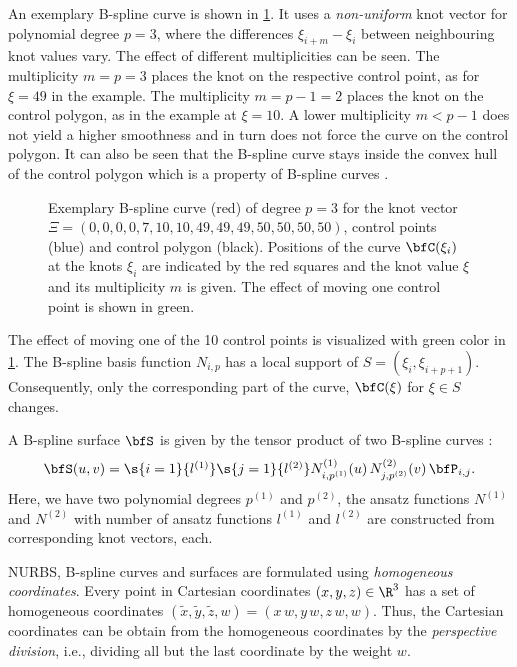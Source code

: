 An exemplary B-spline curve is shown in \cref{fig:bspline_curve}. It uses a \emph{non-uniform} knot vector for polynomial degree $p=3$, where the differences $\xi_{i+m} - \xi_i$ between neighbouring knot values vary. The effect of different multiplicities can be seen. The multiplicity $m=p=3$ places the knot on the respective control point, as for $\xi=49$ in the example. The multiplicity $m=p-1=2$ places the knot on the control polygon, as in the example at $\xi=10$. A lower multiplicity $m < p-1$ does not yield a higher smoothness and in turn does not force the curve on the control polygon. It can also be seen that the B-spline curve stays inside the convex hull of the control polygon which is a property of B-spline curves \cite{piegl2012nurbs}.

\begin{figure}%
  \centering%
  \def\svgwidth{8cm}%
  \caption{Exemplary B-spline curve (red) of degree $p=3$ for the knot vector $\Xi = (0,0,0,0,7,10,10,49,49,49,50,50,50,50)$, control points (blue) and control polygon (black).
  Positions of the curve $\bfC(\xi_i)$ at the knots $\xi_i$ are indicated by the red squares and the knot value $\xi$ and its multiplicity $m$ is given. The effect of moving one control point is shown in green.}%
  \label{fig:bspline_curve}%
\end{figure}%
%
The effect of moving one of the 10 control points is visualized with green color in \cref{fig:bspline_curve}.
The B-spline basis function $N_{i,p}$ has a local support of $S=(\xi_i,\xi_{i+p+1})$. Consequently, only the corresponding part of the curve, $\bfC(\xi)$ for $\xi \in S$ changes.

A B-spline surface $\bfS$ is given by the tensor product of two B-spline curves :
\begin{equation}\label{eq:bspline_surface}
  \begin{array}{lll}
    \bfS(u,v) = \s{i=1}{l^{(1)}}\s{j=1}{l^{(2)}} N^{(1)}_{i,p^{(1)}}(u)\,N^{(2)}_{j,p^{(2)}}(v)\, \bfP_{i,j}.
  \end{array}
\end{equation}
Here, we have two polynomial degrees $p^{(1)}$ and $p^{(2)}$, the ansatz functions $N^{(1)}$ and $N^{(2)}$ with number of ansatz functions $l^{(1)}$ and $l^{(2)}$ are constructed from corresponding knot vectors, each.

NURBS, B-spline curves and surfaces are formulated using \emph{homogeneous coordinates}. Every point in Cartesian coordinates $(x,y,z) \in \R^3$ has a set of homogeneous coordinates $(\tilde{x},\tilde{y},\tilde{z},w)=(x\,w,y\,w,z\,w,w)$. Thus, the Cartesian coordinates can be obtain from the homogeneous coordinates by the \emph{perspective division}, i.e., dividing all but the last coordinate by the weight $w$.

